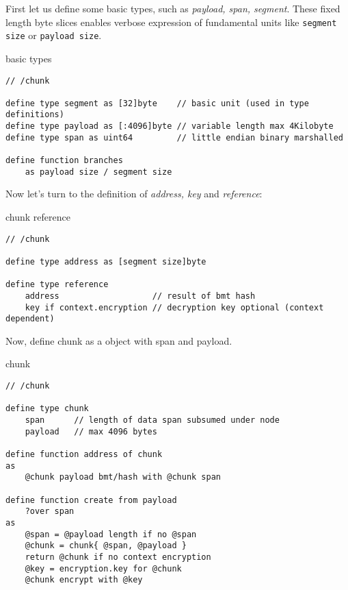 First let us define some basic types, such as \emph{payload, span, segment}. These fixed length byte slices enables verbose expression of fundamental units like \lstinline{segment size} or \lstinline{payload size}.

\begin{definition}{basic types}\label{def:chunk-constants}
\begin{lstlisting}[language=buzz1]
// /chunk

define type segment as [32]byte    // basic unit (used in type definitions)
define type payload as [:4096]byte // variable length max 4Kilobyte
define type span as uint64         // little endian binary marshalled

define function branches 
    as payload size / segment size

\end{lstlisting}
\end{definition}

Now  let's turn to the definition of \emph{address,  key} and \emph{reference}:                                             

\begin{definition}{chunk reference}\label{def:chunk-reference}
\begin{lstlisting}[language=buzz1]
// /chunk

define type address as [segment size]byte

define type reference 
    address                   // result of bmt hash
    key if context.encryption // decryption key optional (context dependent)

\end{lstlisting}
\end{definition}

Now, define chunk as a object with span  and payload.

\begin{definition}{chunk}\label{def:chunks}
\begin{lstlisting}[language=buzz1]
// /chunk

define type chunk
    span      // length of data span subsumed under node
    payload   // max 4096 bytes 

define function address of chunk
as
    @chunk payload bmt/hash with @chunk span 

define function create from payload
    ?over span
as
    @span = @payload length if no @span
    @chunk = chunk{ @span, @payload }
    return @chunk if no context encryption
    @key = encryption.key for @chunk 
    @chunk encrypt with @key
\end{lstlisting}
\end{definition}

